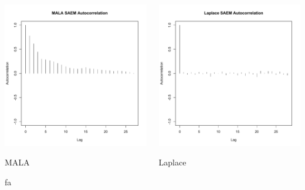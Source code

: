 \documentclass[xcolor={dvipsnames}]{beamer}
\begin{document}
\begin{frame}
\begin{columns}
\begin{column}{.30 \textwidth}
      \includegraphics[scale=0.2]{mala_autocorr.pdf}
      \begin{center}
      \caption{MALA}fa
      \end{center}
    \end{column}

    \begin{column}{.30 \textwidth} %
      
      \includegraphics[scale=0.2]{laplace_autocorr.pdf}
      \begin{center}
      \caption{Laplace}
      \end{center}
    \end{column}
  \end{columns}

\end{frame}
\end{document}

